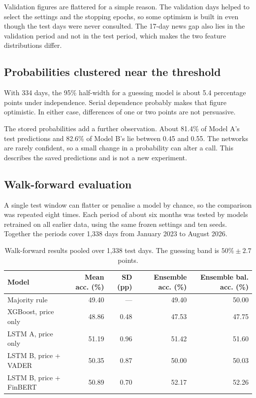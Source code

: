 
Validation figures are flattered for a simple reason. The validation days helped to select the settings and the stopping epochs, so some optimism is built in even though the test days were never consulted. The 17-day news gap also lies in the validation period and not in the test period, which makes the two feature distributions differ.

\subsection{Probabilities clustered near the threshold}
With 334 days, the 95\% half-width for a guessing model is about 5.4 percentage points under independence. Serial dependence probably makes that figure optimistic. In either case, differences of one or two points are not persuasive.

The stored probabilities add a further observation. About 81.4\% of Model A's test predictions and 82.6\% of Model B's lie between 0.45 and 0.55. The networks are rarely confident, so a small change in a probability can alter a call. This describes the saved predictions and is not a new experiment.


\subsection{Walk-forward evaluation}
A single test window can flatter or penalise a model by chance, so the comparison was repeated eight times. Each period of about six months was tested by models retrained on all earlier data, using the same frozen settings and ten seeds. Together the periods cover 1,338 days from January 2023 to August 2026.

\begin{table}[htbp]\centering\small
\caption{Walk-forward results pooled over 1,338 test days. The guessing band is $50\% \pm 2.7$ points.}\label{tab:wfpooled}
\begin{tabularx}{\textwidth}{Xrrrr}
\toprule
Model & Mean acc. (\%) & SD (pp) & Ensemble acc. (\%) & Ensemble bal. acc. (\%)\\\midrule
Majority rule & 49.40 & --- & 49.40 & 50.00\\
XGBoost, price only & 48.86 & 0.48 & 47.53 & 47.75\\
LSTM A, price only & 51.19 & 0.96 & 51.42 & 51.60\\
LSTM B, price + VADER & 50.35 & 0.87 & 50.00 & 50.03\\
LSTM B, price + FinBERT & 50.89 & 0.70 & 52.17 & 52.26\\
\bottomrule
\end{tabularx}
\end{table}

